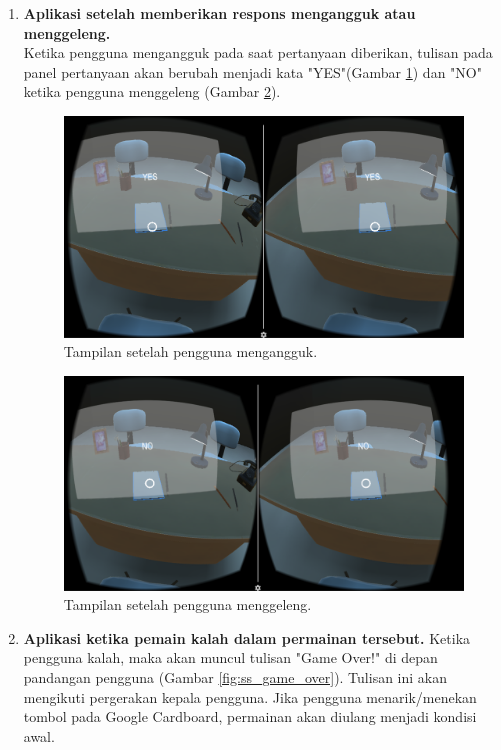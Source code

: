 \begin{enumerate}
    \item \textbf{Aplikasi setelah memberikan respons mengangguk atau menggeleng.}\\
    Ketika pengguna mengangguk pada saat pertanyaan diberikan, tulisan pada panel pertanyaan akan berubah menjadi kata "YES"(Gambar \ref{fig:ss_pengguna_mengangguk}) dan "NO" ketika pengguna menggeleng (Gambar \ref{fig:ss_pengguna_menggeleng}).
    
    \begin{figure}[htbp]
    \centering
    \includegraphics[scale=0.53]{Gambar/screenshot-aplikasi/pengguna-mengangguk.png}
    \caption{Tampilan setelah pengguna mengangguk.} 
    \label{fig:ss_pengguna_mengangguk}
    \end{figure}
    
    \begin{figure}[htbp]
    \centering
    \includegraphics[scale=0.53]{Gambar/screenshot-aplikasi/pengguna-menggeleng.png}
    \caption{Tampilan setelah pengguna menggeleng.} 
    \label{fig:ss_pengguna_menggeleng}
    \end{figure}
    
    \item \textbf{Aplikasi ketika pemain kalah dalam permainan tersebut.}
    Ketika pengguna kalah, maka akan muncul tulisan "Game Over!" di depan pandangan pengguna (Gambar \ref{fig:ss_game_over}). Tulisan ini akan mengikuti pergerakan kepala pengguna. Jika pengguna menarik/menekan tombol pada Google Cardboard, permainan akan diulang menjadi kondisi awal.
    

\end{enumerate}
